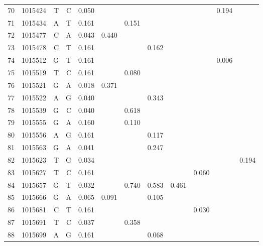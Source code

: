 \documentclass{bmcart}
\begin{document}
\begin{table}[htbp]
\begin{threeparttable}
\begin{tabular}{rrrrrrrrrrrr}
    70    & 1015424 & T     & C     & 0.050 &       &       &       &       &       & 0.194 &  \\
    71    & 1015434 & A     & T     & 0.161 &       & 0.151 &       &       &       &       &  \\
    72    & 1015477 & C     & A     & 0.043 & 0.440 &       &       &       &       &       &  \\
    73    & 1015478 & C     & T     & 0.161 &       &       & 0.162 &       &       &       &  \\
    74    & 1015512 & G     & T     & 0.161 &       &       &       &       &       & 0.006 &  \\
    75    & 1015519 & T     & C     & 0.161 &       & 0.080 &       &       &       &       &  \\
    76    & 1015521 & G     & A     & 0.018 & 0.371 &       &       &       &       &       &  \\
    77    & 1015522 & A     & G     & 0.040 &       &       & 0.343 &       &       &       &  \\
    78    & 1015539 & G     & C     & 0.040 &       & 0.618 &       &       &       &       &  \\
    79    & 1015555 & G     & A     & 0.160 &       & 0.110 &       &       &       &       &  \\
    80    & 1015556 & A     & G     & 0.161 &       &       & 0.117 &       &       &       &  \\
    81    & 1015563 & G     & A     & 0.041 &       &       & 0.247 &       &       &       &  \\
    82    & 1015623 & T     & G     & 0.034 &       &       &       &       &       &       & 0.194 \\
    83    & 1015627 & T     & C     & 0.161 &       &       &       &       & 0.060 &       &  \\
    84    & 1015657 & G     & T     & 0.032 &       & 0.740 & 0.583 & 0.461 &       &       &  \\
    85    & 1015666 & G     & A     & 0.065 & 0.091 &       & 0.105 &       &       &       &  \\
    86    & 1015681 & C     & T     & 0.161 &       &       &       &       & 0.030 &       &  \\
    87    & 1015691 & T     & C     & 0.037 &       & 0.358 &       &       &       &       &  \\
    88    & 1015699 & A     & G     & 0.161 &       &       & 0.068 &       &       &       &  \\

\end{tabular}
\end{threeparttable}
\end{table}
\end{document}
